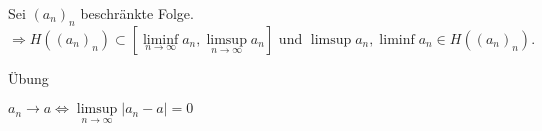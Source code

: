 \begin{kor}
	Sei \((a_n)_n\) beschränkte Folge.
	\[ \Rightarrow H((a_n)_n) \subset [ \liminf\limits_{n\rightarrow\infty}a_n, \limsup\limits_{n\rightarrow\infty}a_n ] \text{ und } \limsup a_n, \liminf a_n \in H((a_n)_n). \]
\end{kor}
\begin{bew}
	Übung
\end{bew}
\(a_n \rightarrow a \Leftrightarrow \limsup\limits_{n\rightarrow\infty}|a_n - a| = 0 \)
